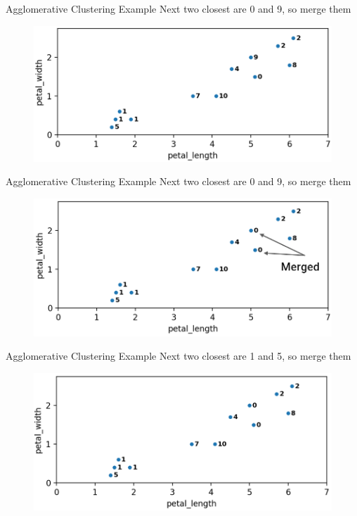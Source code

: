 \documentclass[aspectratio=169]{../latex_main/tntbeamer}  %
\begin{document}
	
	\begin{frame}{Agglomerative Clustering Example}
	    Next two closest are 0 and 9, so merge them
	    \begin{figure}
	        \centering
	        \includegraphics[scale=.35]{Bild36}
	    \end{figure}
	\end{frame}
	
	
	\begin{frame}{Agglomerative Clustering Example}
	    Next two closest are 0 and 9, so merge them
	    \begin{figure}
	        \centering
	        \includegraphics[scale=.35]{Bild37}
	    \end{figure}
	\end{frame}
	
	
	\begin{frame}{Agglomerative Clustering Example}
	    Next two closest are 1 and 5, so merge them
	    \begin{figure}
	        \centering
	        \includegraphics[scale=.35]{Bild38}
	    \end{figure}
	\end{frame}
	
\end{document}
